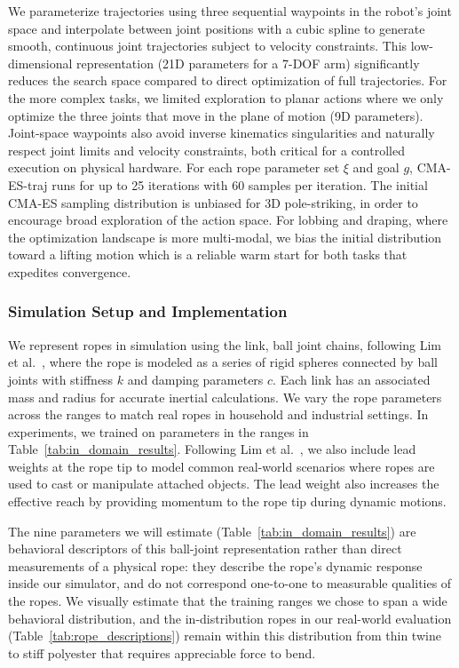 \documentclass[conference]{IEEEtran}
\begin{document}
We parameterize trajectories using three sequential waypoints in the robot's joint space and interpolate between joint positions with a cubic spline to generate smooth, continuous joint trajectories subject to velocity constraints. This low-dimensional representation (21D parameters for a 7-DOF arm) significantly reduces the search space compared to direct optimization of full trajectories. For the more complex tasks, we limited exploration to planar actions where we only optimize the three joints that move in the plane of motion (9D parameters). Joint-space waypoints also avoid inverse kinematics singularities and naturally respect joint limits and velocity constraints, both critical for a controlled execution on physical hardware. For each rope parameter set $\xi$ and goal $g$, CMA-ES-traj runs for up to 25 iterations with 60 samples per iteration. The initial CMA-ES sampling distribution is unbiased for 3D pole-striking, in order to encourage broad exploration of the action space. For lobbing and draping, where the optimization landscape is more multi-modal, we bias the initial distribution toward a lifting motion which is a reliable warm start for both tasks that expedites convergence.


\subsubsection*{Simulation Setup and Implementation}
We represent ropes in simulation using the link, ball joint chains, following Lim et al.~\cite{lim_planar_2022}, where the rope is modeled as a series of rigid spheres connected by ball joints with stiffness $k$ and damping parameters $c$. Each link has an associated mass and radius for accurate inertial calculations. We vary the rope parameters across the ranges to match real ropes in household and industrial settings.  In experiments, we trained on parameters in the ranges in Table~\ref{tab:in_domain_results}. 
Following Lim et al.~\cite{lim_planar_2022}, we also include lead weights at the rope tip to model common real-world scenarios where ropes are used to cast or manipulate attached objects. The lead weight also increases the effective reach by providing momentum to the rope tip during dynamic motions.

The nine parameters we will estimate (Table~\ref{tab:in_domain_results}) are behavioral descriptors of this ball-joint representation rather than direct measurements of a physical rope: they describe the rope's dynamic response inside our simulator, and do not correspond one-to-one to measurable qualities of the ropes. We visually estimate that the training ranges we chose to span a wide behavioral distribution, and the in-distribution ropes in our real-world evaluation (Table~\ref{tab:rope_descriptions}) remain within this distribution from thin twine to stiff polyester that requires appreciable force to bend.
\end{document}
